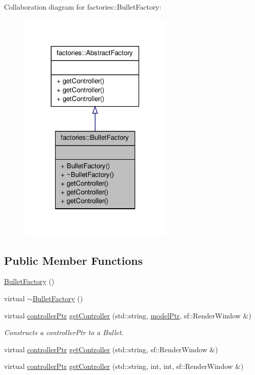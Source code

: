 \-Collaboration diagram for factories\-:\-:\-Bullet\-Factory\-:
\nopagebreak
\begin{figure}[H]
\begin{center}
\leavevmode
\includegraphics[width=210pt]{da/ddc/classfactories_1_1BulletFactory__coll__graph}
\end{center}
\end{figure}
\subsection*{\-Public \-Member \-Functions}
\begin{DoxyCompactItemize}
\item 
\hyperlink{classfactories_1_1BulletFactory_a5af74b507fc4f0fe39fb94efbf159a5c}{\-Bullet\-Factory} ()
\item 
virtual \hyperlink{classfactories_1_1BulletFactory_a789745f38774d8a97593881eb3f42405}{$\sim$\-Bullet\-Factory} ()
\item 
virtual \hyperlink{Game_8h_a21b04f6cf2d5990b82725fac5ea2ce9a}{controller\-Ptr} \hyperlink{classfactories_1_1BulletFactory_a72f1f2e47e59f37c17a53c1dac061e39}{get\-Controller} (std\-::string, \hyperlink{ModelView_8h_a78966ddb517fca8d2b29a2bc5c31e74e}{model\-Ptr}, sf\-::\-Render\-Window \&)
\begin{DoxyCompactList}\small\item\em \-Constructs a controller\-Ptr to a \-Bullet. \end{DoxyCompactList}\item 
virtual \hyperlink{Game_8h_a21b04f6cf2d5990b82725fac5ea2ce9a}{controller\-Ptr} \hyperlink{classfactories_1_1BulletFactory_a161a76247b1e0732ab5ae8874b57bd53}{get\-Controller} (std\-::string, sf\-::\-Render\-Window \&)
\item 
virtual \hyperlink{Game_8h_a21b04f6cf2d5990b82725fac5ea2ce9a}{controller\-Ptr} \hyperlink{classfactories_1_1BulletFactory_aeb404de6dd2ef9c62eb245e8a3f53f25}{get\-Controller} (std\-::string, int, int, sf\-::\-Render\-Window \&)
\end{DoxyCompactItemize}



